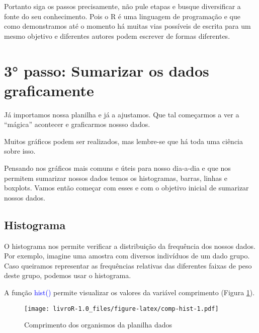 \documentclass[titlepage, oneside, openany, a4paper]{book}
\newenvironment{Shaded}{\begin{snugshade}}{\end{snugshade}}
\newcommand{\KeywordTok}[1]{\textcolor[rgb]{0.13,0.29,0.53}{\textbf{#1}}}
\newcommand{\NormalTok}[1]{#1}
\newcommand{\OperatorTok}[1]{\textcolor[rgb]{0.81,0.36,0.00}{\textbf{#1}}}
\begin{document}
Portanto siga os passos precisamente, não pule etapas e busque diversificar a fonte do seu conhecimento. Pois o R é uma linguagem de programação e que como demonstramos até o momento há muitas vias possíveis de escrita para um mesmo objetivo e diferentes autores podem escrever de formas diferentes.

\hypertarget{passo-sumarizar-os-dados-graficamente}{%
\section{3° passo: Sumarizar os dados graficamente}\label{passo-sumarizar-os-dados-graficamente}}

Já importamos nossa planilha e já a ajustamos. Que tal começarmos a ver a ``mágica'' acontecer e graficarmos nossso dados.

Muitos gráficos podem ser realizados, mas lembre-se que há toda uma ciência sobre isso.

Pensando nos gráficos mais comuns e úteis para nosso dia-a-dia e que nos permitem sumarizar nossos dados temos os histogramas, barras, linhas e boxplots. Vamos então começar com esses e com o objetivo inicial de sumarizar nossos dados.

\hypertarget{histograma}{%
\subsection{Histograma}\label{histograma}}

O histograma nos permite verificar a distribuição da frequência dos nossos dados. Por exemplo, imagine uma amostra com diversos indivíduos de um dado grupo. Caso queiramos representar as frequências relativas das diferentes faixas de peso deste grupo, podemos usar o histograma.

A função \textcolor{blue}{hist()} permite visualizar os valores da variável comprimento (Figura \ref{fig:comp-hist}).

\begin{Shaded}
\end{Shaded}

\begin{figure}
\centering
\texttt{[image: livroR-1.0\_files/figure-latex/comp-hist-1.pdf]}
\caption{\label{fig:comp-hist}Comprimento dos organismos da planilha dados}
\end{figure}
\end{document}

